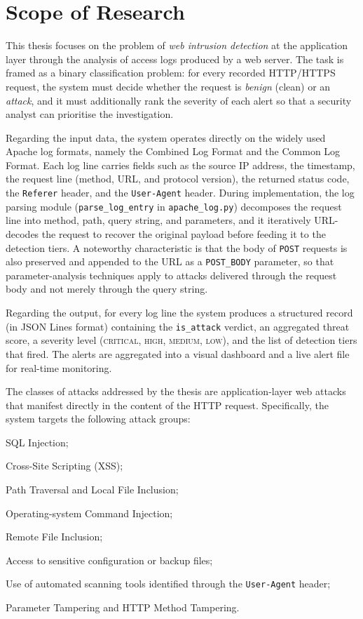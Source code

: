 \section{Scope of Research}
\label{sec:scope}

This thesis focuses on the problem of \emph{web intrusion detection} at
the application layer through the analysis of access logs produced by a
web server. The task is framed as a binary classification problem: for
every recorded HTTP/HTTPS request, the system must decide whether the
request is \emph{benign} (clean) or an \emph{attack}, and it must
additionally rank the severity of each alert so that a security analyst
can prioritise the investigation.

Regarding the input data, the system operates directly on the widely used
Apache log formats, namely the Combined Log Format and the Common Log
Format. Each log line carries fields such as the source IP address, the
timestamp, the request line (method, URL, and protocol version), the
returned status code, the \texttt{Referer} header, and the
\texttt{User-Agent} header. During implementation, the log parsing module
(\texttt{parse\_log\_entry} in \texttt{apache\_log.py}) decomposes the
request line into method, path, query string, and parameters, and it
iteratively URL-decodes the request to recover the original payload before
feeding it to the detection tiers. A noteworthy characteristic is that the
body of \texttt{POST} requests is also preserved and appended to the URL
as a \texttt{POST\_BODY} parameter, so that parameter-analysis techniques
apply to attacks delivered through the request body and not merely through
the query string.

Regarding the output, for every log line the system produces a structured
record (in JSON Lines format) containing the \texttt{is\_attack} verdict,
an aggregated threat score, a severity level (\textsc{critical},
\textsc{high}, \textsc{medium}, \textsc{low}), and the list of detection
tiers that fired. The alerts are aggregated into a visual dashboard and a
live alert file for real-time monitoring.

The classes of attacks addressed by the thesis are application-layer web
attacks that manifest directly in the content of the HTTP request.
Specifically, the system targets the following attack groups:

\begin{romanlist}
  \item SQL Injection;
  \item Cross-Site Scripting (XSS);
  \item Path Traversal and Local File Inclusion;
  \item Operating-system Command Injection;
  \item Remote File Inclusion;
  \item Access to sensitive configuration or backup files;
  \item Use of automated scanning tools identified through the
        \texttt{User-Agent} header;
  \item Parameter Tampering and HTTP Method Tampering.
\end{romanlist}

